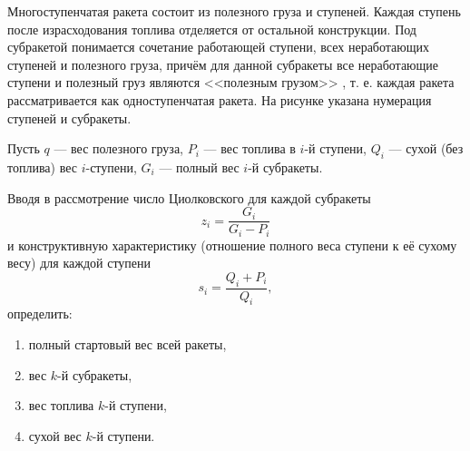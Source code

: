 Многоступенчатая ракета состоит из полезного груза и ступеней.
Каждая ступень после израсходования топлива отделяется от остальной конструкции.
Под субракетой понимается сочетание работающей ступени,
всех неработающих ступеней и полезного груза,
причём для данной субракеты все неработающие ступени и полезный груз
являются <<полезным грузом>> , т. е. каждая ракета
рассматривается как одноступенчатая ракета.
На рисунке указана нумерация ступеней и субракеты.

Пусть $q$ --- вес полезного груза, $P_i$ --- вес топлива в $i$-й ступени,
$Q_i$ --- сухой (без топлива) вес $i$-ступени,
$G_i$ --- полный вес $i$-й субракеты.

Вводя в рассмотрение число Циолковского для каждой субракеты
$$z_i = \frac{G_i}{G_i - P_i}$$
и конструктивную характеристику
(отношение полного веса ступени к её сухому весу)
для каждой ступени
$$s_i = \frac{Q_i + P_i}{Q_i},$$
определить:
\begin{enumerate}
\item полный стартовый вес всей ракеты,
\item вес $k$-й субракеты,
\item вес топлива $k$-й ступени,
\item сухой вес $k$-й ступени.
\end{enumerate}
